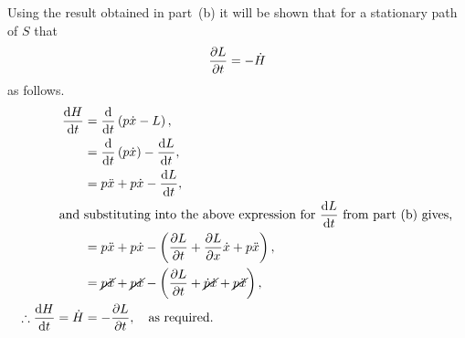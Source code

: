 
Using the result obtained in part~(b) it will be shown that for a stationary path of $S$ that
\begin{equation}
	\frac{\partial L}{\partial t} = -\dot{H}
\end{equation}
as follows.
\begin{align*}
	\frac{\mathrm{d}H}{\mathrm{d}t} &= \frac{\mathrm{d}}{\mathrm{d}t}\left(p\dot{x} - L\right),\\
	&= \frac{\mathrm{d}}{\mathrm{d}t}\left(p\dot{x}\right) -\frac{\mathrm{d}L}{\mathrm{d}t},\\
	&= p\ddot{x} + p\dot{x} -\frac{\mathrm{d}L}{\mathrm{d}t},\\
	\text{and }&\text{substituting into the above expression for } \frac{\mathrm{d}L}{\mathrm{d}t} \text{ from part~(b) gives,}\\
	&= p\ddot{x} + p\dot{x} - \left(\frac{\partial L}{\partial t} + \frac{\partial L}{\partial x}\dot{x} + p\ddot{x}\right),\\
	&= \cancel{p\ddot{x}} + \cancel{p\dot{x}} - \left(\frac{\partial L}{\partial t} + \cancel{\dot{p}\dot{x}} + \cancel{p\ddot{x}}\right),\\
	\therefore \frac{\mathrm{d}H}{\mathrm{d}t} =\dot{H} &= -\frac{\partial L}{\partial t},\quad\text{as required.}\quad
\end{align*}
